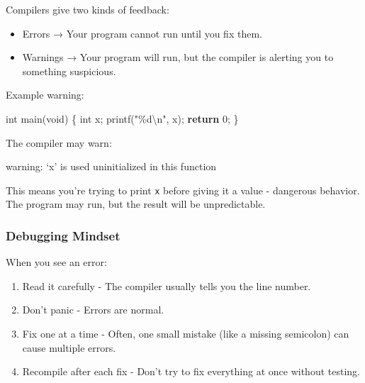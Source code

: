 \documentclass[
  letterpaper,
  DIV=11,
  numbers=noendperiod]{scrreprt}
\newenvironment{Shaded}{\begin{snugshade}}{\end{snugshade}}
\newcommand{\ControlFlowTok}[1]{\textcolor[rgb]{0.00,0.23,0.31}{\textbf{#1}}}
\newcommand{\DataTypeTok}[1]{\textcolor[rgb]{0.68,0.00,0.00}{#1}}
\newcommand{\DecValTok}[1]{\textcolor[rgb]{0.68,0.00,0.00}{#1}}
\newcommand{\ExtensionTok}[1]{\textcolor[rgb]{0.00,0.23,0.31}{#1}}
\newcommand{\NormalTok}[1]{\textcolor[rgb]{0.00,0.23,0.31}{#1}}
\newcommand{\OperatorTok}[1]{\textcolor[rgb]{0.37,0.37,0.37}{#1}}
\newcommand{\SpecialCharTok}[1]{\textcolor[rgb]{0.37,0.37,0.37}{#1}}
\newcommand{\StringTok}[1]{\textcolor[rgb]{0.13,0.47,0.30}{#1}}
\providecommand{\tightlist}{%
  \setlength{\itemsep}{0pt}\setlength{\parskip}{0pt}}
\begin{document}
Compilers give two kinds of feedback:

\begin{itemize}
\tightlist
\item
  Errors → Your program cannot run until you fix them.
\item
  Warnings → Your program will run, but the compiler is alerting you to
  something suspicious.
\end{itemize}

Example warning:

\begin{Shaded}
\begin{Highlighting}[]
\DataTypeTok{int}\NormalTok{ main}\OperatorTok{(}\DataTypeTok{void}\OperatorTok{)} \OperatorTok{\{}
    \DataTypeTok{int}\NormalTok{ x}\OperatorTok{;}
\NormalTok{    printf}\OperatorTok{(}\StringTok{"}\SpecialCharTok{\%d\textbackslash{}n}\StringTok{"}\OperatorTok{,}\NormalTok{ x}\OperatorTok{);}
    \ControlFlowTok{return} \DecValTok{0}\OperatorTok{;}
\OperatorTok{\}}
\end{Highlighting}
\end{Shaded}

The compiler may warn:

\begin{Shaded}
\begin{Highlighting}[]
\ExtensionTok{warning:}\NormalTok{ ‘x’ is used uninitialized in this function}
\end{Highlighting}
\end{Shaded}

This means you're trying to print \texttt{x} before giving it a value -
dangerous behavior. The program may run, but the result will be
unpredictable.

\subsubsection{Debugging Mindset}\label{debugging-mindset}

When you see an error:

\begin{enumerate}
\def\labelenumi{\arabic{enumi}.}
\tightlist
\item
  Read it carefully - The compiler usually tells you the line number.
\item
  Don't panic - Errors are normal.
\item
  Fix one at a time - Often, one small mistake (like a missing
  semicolon) can cause multiple errors.
\item
  Recompile after each fix - Don't try to fix everything at once without
  testing.
\end{enumerate}
\end{document}
